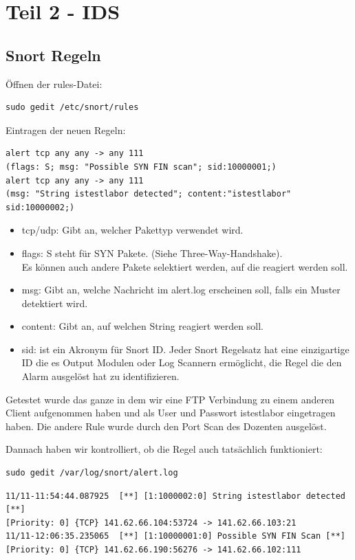\documentclass[a4paper]{report}
\begin{document}
\newpage
\section{Teil 2 - IDS}
	
	
\subsection{Snort Regeln}

Öffnen der rules-Datei:
\begin{lstlisting}
sudo gedit /etc/snort/rules
\end{lstlisting}

Eintragen der neuen Regeln:

\begin{lstlisting}
alert tcp any any -> any 111 
(flags: S; msg: "Possible SYN FIN scan"; sid:10000001;)
alert tcp any any -> any 111
(msg: "String istestlabor detected"; content:"istestlabor" sid:10000002;)
\end{lstlisting}

\begin{itemize}
\item tcp/udp: Gibt an, welcher Pakettyp verwendet wird.

\item flags: S steht für SYN Pakete. (Siehe Three-Way-Handshake).\\
Es können auch andere Pakete selektiert werden, auf die reagiert werden soll.
\item msg: Gibt an, welche Nachricht im alert.log erscheinen soll, falls ein Muster detektiert wird.
\item content: Gibt an, auf welchen String reagiert werden soll.
\item sid: ist ein Akronym für Snort ID.  Jeder Snort Regelsatz hat eine einzigartige ID die es Output Modulen oder Log Scannern ermöglicht, die Regel die den Alarm ausgelöst hat zu identifizieren. 
\end{itemize}

Getestet wurde das ganze in dem wir eine FTP Verbindung zu einem anderen Client aufgenommen haben und als User und Passwort istestlabor eingetragen haben.
Die andere Rule wurde durch den Port Scan des Dozenten ausgelöst.

Dannach haben wir kontrolliert, ob die Regel auch tatsächlich funktioniert:

\begin{lstlisting}
sudo gedit /var/log/snort/alert.log
\end{lstlisting}

\begin{lstlisting}
11/11-11:54:44.087925  [**] [1:1000002:0] String istestlabor detected [**]
[Priority: 0] {TCP} 141.62.66.104:53724 -> 141.62.66.103:21
11/11-12:06:35.235065  [**] [1:10000001:0] Possible SYN FIN Scan [**]
[Priority: 0] {TCP} 141.62.66.190:56276 -> 141.62.66.102:111
\end{lstlisting}
\end{document}
